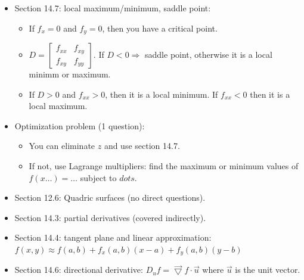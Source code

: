 \documentclass{article}
\newcommand{\tri}{\vec{\bigtriangledown}}
\newcommand{\mat}[4]{\begin{bmatrix} #1 & #2 \\ #3 & #4 \end{bmatrix}}
\begin{document}
\begin{itemize}
    \item Section 14.7: local maximum/minimum, saddle point: \begin{itemize}
        \itemsep 0em
        \item If $f_x=0$ and $f_y=0$, then you have a critical point.
        \item $D=\mat{f_{xx}}{f_{xy}}{f_{xy}}{f_{yy}}$. If $D<0\Rightarrow$ saddle point, otherwise it is a local minimm or maximum.
        \item If $D>0$ and $f_{xx}>0$, then it is a local minimum. If $f_{xx}<0$ then it is a local maximum.
    \end{itemize}
    \item Optimization problem (1 question): \begin{itemize}
        \itemsep 0em
        \item You can eliminate $z$ and use section 14.7.
        \item If not, use Lagrange multipliers: find the maximum or minimum values of $f(x\dots)=\dots$ subject to $dots$.
    \end{itemize}
    \item Section 12.6: Quadric surfaces (no direct questions).
    \item Section 14.3: partial derivatives (covered indirectly).
    \item Section 14.4: tangent plane and linear approximation: $f(x,y)\approx f(a,b)+f_x(a,b)(x-a)+f_y(a,b)(y-b)$
    \item Section 14.6: directional derivative: $D_uf=\tri f\cdot\vec{u}$ where $\vec{u}$ is the unit vector.
\end{itemize}
\end{document}
